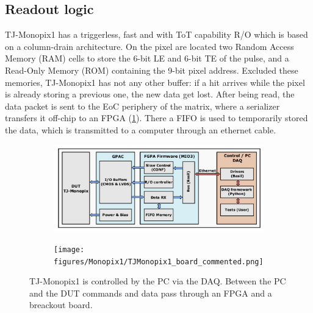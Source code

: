 \subsection{Readout logic}\label{chap:Monopix_RO}
    TJ-Monopix1 has a triggerless, fast and with ToT capability R/O which is based on a column-drain architecture.      
    On the pixel are located two Random Access Memory (RAM) cells to store the 6-bit LE and 6-bit TE of the pulse, and a Read-Only Memory (ROM) containing the 9-bit pixel address. Excluded these memories, TJ-Monopix1 has not any other buffer: if a hit arrives while the pixel is already storing a previous one, the new data get lost. After being read, the data packet is sent to the EoC periphery of the matrix, where a serializer transfers it off-chip to an FPGA (\ref{fig:R/O-system}). There a FIFO is used to temporarily stored the data, which is transmitted to a computer through an ethernet cable.  
    \begin{figure}
        \begin{subfigure}{\textwidth}
        \centering
        \includegraphics[clip,width=0.69\linewidth]{figures/Monopix1/schematic_boards.png}
        \end{subfigure}
        \begin{subfigure}{\textwidth}
        \centering
        \texttt{[image: figures/Monopix1/TJMonopix1\_board\_commented.png]}
        \end{subfigure}
        \caption{TJ-Monopix1 is controlled by the PC via the DAQ. Between the PC and the DUT commands and data pass through an FPGA and a breackout board.}
        \label{fig:R/O-system}
    \end{figure}


